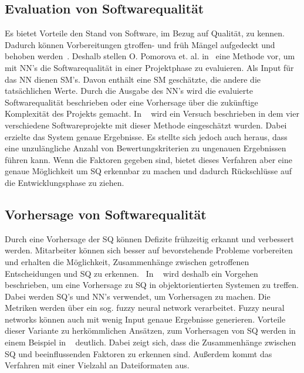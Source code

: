 \subsection{Evaluation von Softwarequalität}
Es bietet Vorteile den Stand von Software, im Bezug auf Qualität, zu kennen. Dadurch können Vorbereitungen gtroffen- und früh Mängel aufgedeckt und behoben werden~\cite{Pomorova2013}. Deshalb stellen O. Pomorova et. al. in~\cite{Pomorova2013} eine Methode vor, um mit NN's die Softwarequalität in einer Projektphase zu evaluieren. Als Input für das NN dienen SM's. Davon enthält eine SM geschätzte, die andere die tatsächlichen Werte.
Durch die Ausgabe des NN's wird die evaluierte Softwarequalität beschrieben oder eine Vorhersage über die zukünftige Komplexität des Projekts gemacht. 
In ~\cite{Pomorova2013} wird ein Versuch beschrieben in dem vier verschiedene Softwareprojekte mit dieser Methode eingeschätzt wurden. Dabei erzielte das System genaue Ergebnisse. Es stellte sich jedoch auch heraus, dass eine unzulängliche Anzahl von Bewertungskriterien zu ungenauen Ergebnissen führen kann.
Wenn die Faktoren gegeben sind, bietet dieses Verfahren aber eine genaue Möglichkeit um SQ erkennbar zu machen und dadurch Rückschlüsse auf die Entwicklungsphase zu ziehen.

\subsection{Vorhersage von Softwarequalität}
Durch eine Vorhersage der SQ können Defizite frühzeitig erkannt und verbessert werden. Mitarbeiter können sich besser auf bevorstehende Probleme vorbereiten und erhalten die Möglichkeit, Zusammenhänge zwischen getroffenen Entscheidungen und SQ zu erkennen.~\cite{Peng2009} In ~\cite{Peng2009} wird deshalb ein Vorgehen beschrieben, um eine Vorhersage zu SQ in objektorientierten Systemen zu treffen. Dabei werden SQ's und NN's verwendet, um Vorhersagen zu machen. Die Metriken werden über ein sog. fuzzy neural network verarbeitet. Fuzzy neural networks können auch mit wenig Input genaue Ergebnisse generieren.
Vorteile dieser Variante zu herkömmlichen Ansätzen, zum Vorhersagen von SQ werden in einem Beispiel in ~\cite{Peng2009} deutlich. Dabei zeigt sich, dass die Zusammenhänge zwischen SQ und beeinflussenden Faktoren zu erkennen sind. Außerdem kommt das Verfahren mit einer Vielzahl an Dateiformaten aus.
